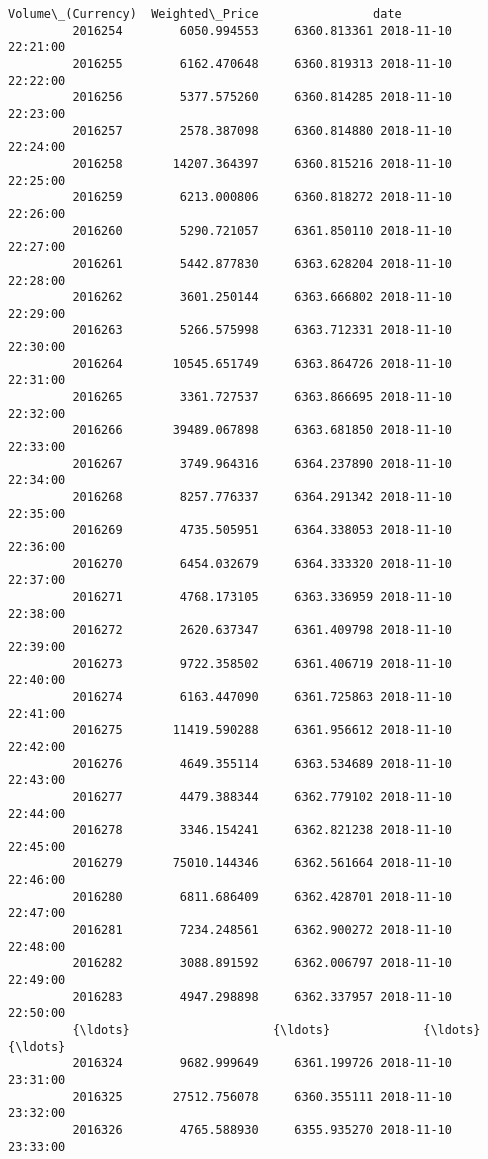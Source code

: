 \documentclass[11pt]{article}
\begin{document}
\begin{Verbatim}[commandchars=\\\{\}]
                  Volume\_(Currency)  Weighted\_Price                date  
         2016254        6050.994553     6360.813361 2018-11-10 22:21:00  
         2016255        6162.470648     6360.819313 2018-11-10 22:22:00  
         2016256        5377.575260     6360.814285 2018-11-10 22:23:00  
         2016257        2578.387098     6360.814880 2018-11-10 22:24:00  
         2016258       14207.364397     6360.815216 2018-11-10 22:25:00  
         2016259        6213.000806     6360.818272 2018-11-10 22:26:00  
         2016260        5290.721057     6361.850110 2018-11-10 22:27:00  
         2016261        5442.877830     6363.628204 2018-11-10 22:28:00  
         2016262        3601.250144     6363.666802 2018-11-10 22:29:00  
         2016263        5266.575998     6363.712331 2018-11-10 22:30:00  
         2016264       10545.651749     6363.864726 2018-11-10 22:31:00  
         2016265        3361.727537     6363.866695 2018-11-10 22:32:00  
         2016266       39489.067898     6363.681850 2018-11-10 22:33:00  
         2016267        3749.964316     6364.237890 2018-11-10 22:34:00  
         2016268        8257.776337     6364.291342 2018-11-10 22:35:00  
         2016269        4735.505951     6364.338053 2018-11-10 22:36:00  
         2016270        6454.032679     6364.333320 2018-11-10 22:37:00  
         2016271        4768.173105     6363.336959 2018-11-10 22:38:00  
         2016272        2620.637347     6361.409798 2018-11-10 22:39:00  
         2016273        9722.358502     6361.406719 2018-11-10 22:40:00  
         2016274        6163.447090     6361.725863 2018-11-10 22:41:00  
         2016275       11419.590288     6361.956612 2018-11-10 22:42:00  
         2016276        4649.355114     6363.534689 2018-11-10 22:43:00  
         2016277        4479.388344     6362.779102 2018-11-10 22:44:00  
         2016278        3346.154241     6362.821238 2018-11-10 22:45:00  
         2016279       75010.144346     6362.561664 2018-11-10 22:46:00  
         2016280        6811.686409     6362.428701 2018-11-10 22:47:00  
         2016281        7234.248561     6362.900272 2018-11-10 22:48:00  
         2016282        3088.891592     6362.006797 2018-11-10 22:49:00  
         2016283        4947.298898     6362.337957 2018-11-10 22:50:00  
         {\ldots}                    {\ldots}             {\ldots}                 {\ldots}  
         2016324        9682.999649     6361.199726 2018-11-10 23:31:00  
         2016325       27512.756078     6360.355111 2018-11-10 23:32:00  
         2016326        4765.588930     6355.935270 2018-11-10 23:33:00  

\end{Verbatim}
\end{document}
